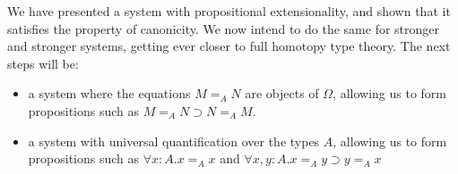 \documentclass[a4paper,UKenglish]{lipics-v2016}
\theoremstyle{plain}
\theoremstyle{definition}
\begin{document}
We have presented a system with propositional extensionality, and shown that it satisfies the property of canonicity.
We now intend to do the same for stronger and stronger systems, getting
ever closer to full homotopy type theory.  The next steps will be:

\begin{itemize}
\item
a system where the equations $M =_A N$ are objects of $\Omega$, allowing us to form propositions such as $M =_A N \supset N =_A M$.
\item
a system with universal quantification over the types $A$, allowing us to form propositions such as $\forall x:A. x =_A x$ and
$\forall x,y : A. x =_A y \supset y =_A x$
\end{itemize}


\end{document}
